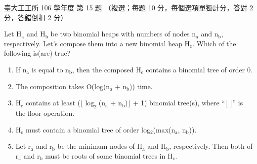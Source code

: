 \begin{pastexam}[label={px:ntu-106-ie-ds-15}]{臺大工工所 106 學年度 第 15 題}
（複選；每題 10 分，每個選項單獨計分，答對 2 分，答錯倒扣 2 分）

Let H$_\mathrm{a}$ and H$_\mathrm{b}$ be two binomial heaps with numbers of nodes n$_\mathrm{a}$ and n$_\mathrm{b}$,
respectively. Let's compose them into a new binomial heap H$_\mathrm{c}$. Which of the following is(are) true?
\begin{enumerate}[label=(\Alph*),nosep]
\item If n$_\mathrm{a}$ is equal to n$_\mathrm{b}$, then the composed H$_\mathrm{c}$ contains a binomial tree of order 0.
\item The composition takes O(log(n$_\mathrm{a}$ + n$_\mathrm{b}$)) time.
\item H$_\mathrm{c}$ contains at least ($\lfloor\log_2$(n$_\mathrm{a}$ + n$_\mathrm{b}$)$\rfloor$ + 1) binomial tree(s),
where ``$\lfloor\ \rfloor$'' is the floor operation.
\item H$_\mathrm{c}$ must contain a binomial tree of order log$_2$(max(n$_\mathrm{a}$, n$_\mathrm{b}$)).
\item Let r$_\mathrm{a}$ and r$_\mathrm{b}$ be the minimum nodes of H$_\mathrm{a}$ and H$_\mathrm{b}$, respectively.
Then both of r$_\mathrm{a}$ and r$_\mathrm{b}$ must be roots of some binomial trees in H$_\mathrm{c}$.
\end{enumerate}
\end{pastexam}

